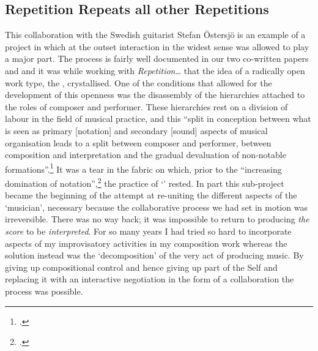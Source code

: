 \subsection[Repetition\ldots]{Repetition Repeats all other Repetitions}
\label{sec:negot-music-work}


This collaboration with the Swedish guitarist Stefan \"{O}stersj\"{o} is an example of a project in which at the outset interaction in the widest sense was allowed to play a major part. The process is fairly well documented in our two co-written papers  and  \nocite{frisk-ost06,frisk-ost06-2} and it was while working with \emph{Repetition\ldots} that the idea of a radically open work type, the , crystallised. One of the conditions that allowed for the development of this openness was the disassembly of the hierarchies attached to the roles of composer and performer. These hierarchies rest on a division of labour in the field of musical practice, and this ``split in conception between what is seen as primary [notation] and secondary [sound] aspects of musical organisation leads to a split between composer and performer, between composition and interpretation and the gradual devaluation of non-notable formations''.\footcite[35]{wis96} It was a tear in the fabric on which, prior to the ``increasing domination of notation'',\footcite{wis96} the practice of `' rested. In part this sub-project became the beginning of the attempt at re-uniting the different aspects of the `musician', necessary because the collaborative process we had set in motion was irreversible. There was no way back; it was impossible to return to producing \emph{the score} to be \emph{interpreted}. For so many years I had tried so hard to incorporate aspects of my improvisatory activities in my composition work whereas the solution instead was the `decomposition' of the very act of producing music. By giving up compositional control and hence giving up part of the Self and replacing it with an interactive negotiation in the form of a collaboration the process was possible.

